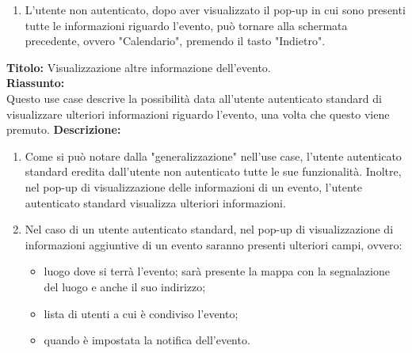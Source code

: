 \begin{listaPersonale}[UC]{}
\begin{listaPersonale2} [UC] {}
\begin{enumerate}
\begin{itemize}
                  \item difficoltà dell'evento;
                  \item nome del calendario di appartenenza
              \end{itemize}
        \item L'utente non autenticato, dopo aver visualizzato il pop-up in cui sono presenti tutte le informazioni riguardo l'evento, può tornare alla schermata precedente, ovvero "Calendario", premendo il tasto "Indietro".
        \end{enumerate}
        \textbf{Titolo: } Visualizzazione altre informazione dell'evento. \\
        \textbf{Riassunto: } \\ Questo use case descrive la possibilità data all'utente autenticato standard di visualizzare ulteriori informazioni riguardo l'evento, una volta che questo viene premuto.
        \textbf{Descrizione: }
        \begin{enumerate}
        \item Come si può notare dalla "generalizzazione" nell'use case, l'utente autenticato standard eredita dall'utente non autenticato tutte le sue funzionalità. Inoltre, nel pop-up di visualizzazione delle informazioni di un evento, l'utente autenticato standard visualizza ulteriori informazioni. 
        \item Nel caso di un utente autenticato standard, nel pop-up di visualizzazione di informazioni aggiuntive di un evento saranno presenti ulteriori campi, ovvero:
              \begin{itemize}
                  \item luogo dove si terrà l'evento; sarà presente la mappa con la segnalazione del luogo e anche il suo indirizzo;
                  \item lista di utenti a cui è condiviso l'evento;
                  \item quando è impostata la notifica dell'evento.
              \end{itemize}
    \end{enumerate}


\end{listaPersonale2}
\end{listaPersonale}
